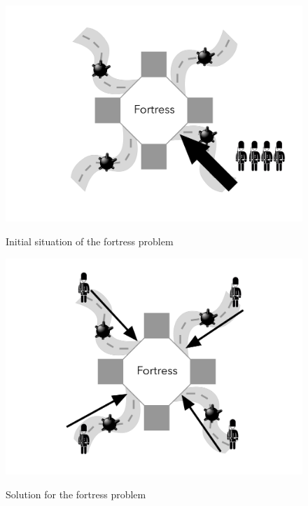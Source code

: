 \documentclass[12pt]{article}
\begin{document}
\begin{figure}[H]
    \centering
    \begin{minipage}[b]{0.40\textwidth}
    	\includegraphics[scale=0.07]{images/fortress_problem.png}
    	\caption{Initial situation of the fortress problem}
    	\centering
    	\label{fig:fortress}
    \end{minipage}
    \hfill
    \begin{minipage}[b]{0.40\textwidth}
    	\includegraphics[scale=0.07]{images/fortress_problem_solution.png}
    	\caption{Solution for the fortress problem}
    	\centering
    	\label{fig:fortress_solution}
    \end{minipage}
\end{figure}
\end{document}
